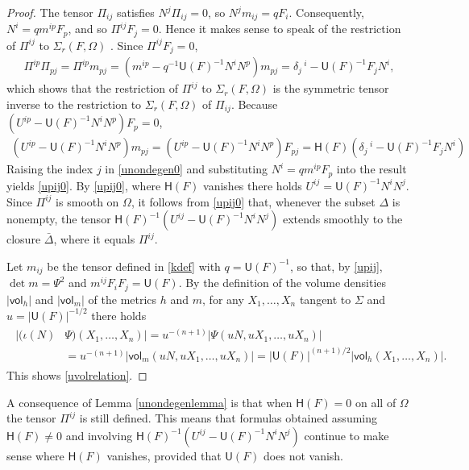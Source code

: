 \documentclass [leqno, 10pt]{amsart}
\theoremstyle{definition}
\numberwithin{equation}{section}
\newcommand{\gn}{N}
\newcommand{\Om}{\Omega}
\newcommand{\imt}{\iota}
\newcommand{\U}{\mathsf{U}}
\newcommand{\lc}{\Sigma}
\renewcommand{\H}{\mathsf{H}}
\newcommand{\vol}{\mathsf{vol}}
\newcommand{\sff}{\Pi}
\begin{document}
\begin{proof}
The tensor $\sff_{ij}$ satisfies $N^{j}\Pi_{ij} = 0$, so $N^{j}m_{ij} = qF_{i}$. Consequently, $N^{i}= qm^{ip}F_{p}$, and so $\sff^{ij}F_{j} = 0$. Hence it makes sense to speak of the restriction of $\sff^{ij}$ to $\lc_{r}(F, \Om)$ . Since $\sff^{ij}F_{j} = 0$,
\begin{align}\label{sffsff}
\sff^{ip}\sff_{pj} = \sff^{ip}m_{pj} = (m^{ip} - q^{-1}\U(F)^{-1}N^{i}N^{p})m_{pj} = \delta_{j}\,^{i} - \U(F)^{-1}F_{j}N^{i},
\end{align}
which shows that the restriction of $\sff^{ij}$ to $\lc_{r}(F, \Om)$ is the symmetric tensor inverse to the restriction to $\lc_{r}(F, \Om)$ of $\sff_{ij}$. Because $(U^{ip} - \U(F)^{-1}N^{i}N^{p})F_{p} = 0$,
\begin{align}\label{unondegen0}
(U^{ip} - \U(F)^{-1}N^{i}N^{p})m_{pj} =(U^{ip} - \U(F)^{-1}N^{i}N^{p})F_{pj} = \H(F)(\delta_{j}\,^{i} - \U(F)^{-1}F_{j}N^{i}) 
\end{align}
Raising the index $j$ in \eqref{unondegen0} and substituting $N^{i} = qm^{ip}F_{p}$ into the result yields \eqref{upij0}.
By \eqref{upij0}, where $\H(F)$ vanishes there holds $U^{ij} = \U(F)^{-1}N^{i}N^{j}$. 
Since $\sff^{ij}$ is smooth on $\Om$, it follows from \eqref{upij0} that, whenever the subset $\Delta$ is nonempty, the tensor $\H(F)^{-1}(U^{ij} - \U(F)^{-1}N^{i}N^{j})$ extends smoothly to the closure $\bar{\Delta}$, where it equals $\sff^{ij}$. 

Let $m_{ij}$ be the tensor defined in \eqref{kdef} with $q = \U(F)^{-1}$, so that, by \eqref{upij}, $\det m = \Psi^{2}$ and $m^{ij}F_{i}F_{j} = \U(F)$. By the definition of the volume densities $|\vol_{h}|$ and $|\vol_{m}|$ of the metrics $h$ and $m$, for any $X_{1}, \dots, X_{n}$ tangent to $\Sigma$ and $u = |\U(F)|^{-1/2}$ there holds
\begin{align}\label{quf}
\begin{split}
|(\imt(\gn)&\Psi)(X_{1}, \dots, X_{n})|  = u^{-(n+1)}\left|\Psi\left(u\gn, uX_{1}, \dots, uX_{n}\right)\right| 
 \\ &= u^{-(n+1)}\left|\vol_{m}\left(u\gn, uX_{1}, \dots, uX_{n}\right)\right|  =  |\U(F)|^{(n+1)/2}|\vol_{h}(X_{1}, \dots, X_{n})|.
\end{split}
\end{align}
This shows \eqref{uvolrelation}.
\end{proof}

\begin{remark}
A consequence of Lemma \ref{unondegenlemma} is that when $\H(F) = 0$ on all of $\Om$ the tensor $\sff^{ij}$ is still defined. This means that formulas obtained assuming $\H(F) \neq 0$ and involving $\H(F)^{-1}(U^{ij}  - \U(F)^{-1}N^{i}N^{j})$ continue to make sense where $\H(F)$ vanishes, provided that $\U(F)$ does not vanish.
\end{remark}
\end{document}
